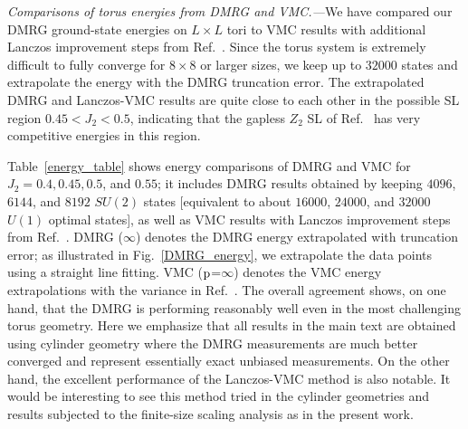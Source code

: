 \documentclass[prl,aps,epsf,showpacs,twocolumn]{revtex4}
\begin{document}
\begin{appendices}
\textit{Comparisons of torus energies from DMRG and VMC.---}We have compared our DMRG ground-state energies on $L \times L$ tori to VMC results with additional Lanczos improvement steps from Ref.~\cite{PRB_88_060402}.
Since the torus system is extremely difficult to fully converge for $8 \times 8$ or larger sizes, we keep up to $32000$ states and 
extrapolate the energy with the DMRG truncation error\cite{converge}. The extrapolated DMRG and Lanczos-VMC results are quite close to each other in the possible SL region $0.45<J_2<0.5$, indicating that the gapless $Z_2$ SL of Ref.~\cite{PRB_88_060402} has very competitive energies in this region.

Table~\ref{energy_table} shows energy comparisons of DMRG and VMC for $J_2 = 0.4,0.45,0.5$, and $0.55$; it includes DMRG results obtained by keeping $4096$, $6144$, and $8192$ $SU(2)$ states [equivalent to about $16000$, $24000$, and $32000$ $U(1)$ optimal states], as well as VMC results with Lanczos improvement steps from Ref.~\cite{PRB_88_060402}. DMRG ($\infty$) denotes the DMRG energy extrapolated with truncation error;
as illustrated in Fig.~\ref{DMRG_energy}, we extrapolate the data points using a straight line fitting. VMC ($\rm p$=$\infty$) denotes the VMC energy extrapolations with the variance in Ref.~\cite{PRB_88_060402}.
The overall agreement shows, on one hand, that the DMRG is performing reasonably well even in the most challenging torus geometry.  Here we emphasize that all results in the main text are obtained using cylinder geometry where the DMRG measurements are much better converged\cite{converge} and represent essentially exact unbiased measurements.  On the other hand, the excellent performance of the Lanczos-VMC method is also notable.  It would be interesting to see this method tried in the cylinder geometries and results subjected to the finite-size scaling analysis as in the present work.

\begin{table}


\end{table}
\end{appendices}
\end{document}
